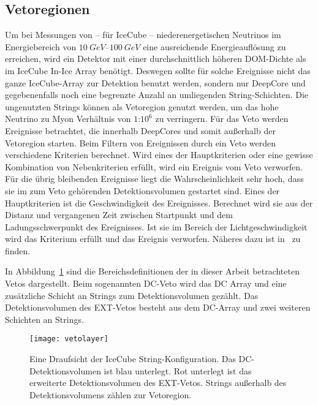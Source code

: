 \subsection*{Vetoregionen}
Um bei Messungen von -- für IceCube -- niederenergetischen Neutrinos im Energiebereich von $\SIrange{10}{100}{GeV}$ eine ausreichende Energieauflösung zu erreichen, wird ein Detektor mit einer durchschnittlich höheren DOM-Dichte als im IceCube In-Ice Array benötigt.
Deswegen sollte für solche Ereignisse nicht das ganze IceCube-Array zur Detektion benutzt werden, sondern nur DeepCore und gegebenenfalls noch eine begrenzte Anzahl an umliegenden String-Schichten.
Die ungenutzten Strings können als Vetoregion genutzt werden, um das hohe Neutrino zu Myon Verhältnis von $1$:$10^6$ zu verringern.
Für das Veto werden Ereignisse betrachtet, die innerhalb DeepCores und somit außerhalb der Vetoregion starten.
Beim Filtern von Ereignissen durch ein Veto werden verschiedene Kriterien berechnet. 
Wird eines der Hauptkriterien oder eine gewisse Kombination von Nebenkriterien erfüllt, wird ein Ereignis vom Veto verworfen.
Für die übrig bleibenden Ereignisse liegt die Wahrscheinlichkeit sehr hoch, dass sie im zum Veto gehörenden Detektionsvolumen gestartet sind.
Eines der Hauptkriterien ist die Geschwindigkeit des Ereignisses.
Berechnet wird sie aus der Distanz und vergangenen Zeit zwischen Startpunkt und dem Ladungsschwerpunkt des Ereignisses.
Ist sie im Bereich der Lichtgeschwindigkeit wird das Kriterium erfüllt und das Ereignis verworfen. 
Näheres dazu ist in~\cite{lowe-filter} zu finden.

In Abbildung~\ref{fig:vetolayer} sind die Bereichsdefinitionen der in dieser Arbeit betrachteten Vetos dargestellt.
Beim sogenannten DC-Veto wird das DC Array und eine zusätzliche Schicht an Strings zum Detektionsvolumen gezählt.
Das Detektionsvolumen des EXT-Vetos besteht aus dem DC-Array und zwei weiteren Schichten an Strings.
\begin{figure}
\begin{center}
    \texttt{[image: vetolayer]}
\end{center}
\vspace{-2em}
\caption{Eine Draufsicht der IceCube String-Konfiguration. Das DC-Detektionsvolumen ist blau unterlegt. Rot unterlegt ist das erweiterte Detektionsvolumen des EXT-Vetos. Strings außerhalb des Detektionsvolumens zählen zur Vetoregion.}
\label{fig:vetolayer}
\end{figure}

